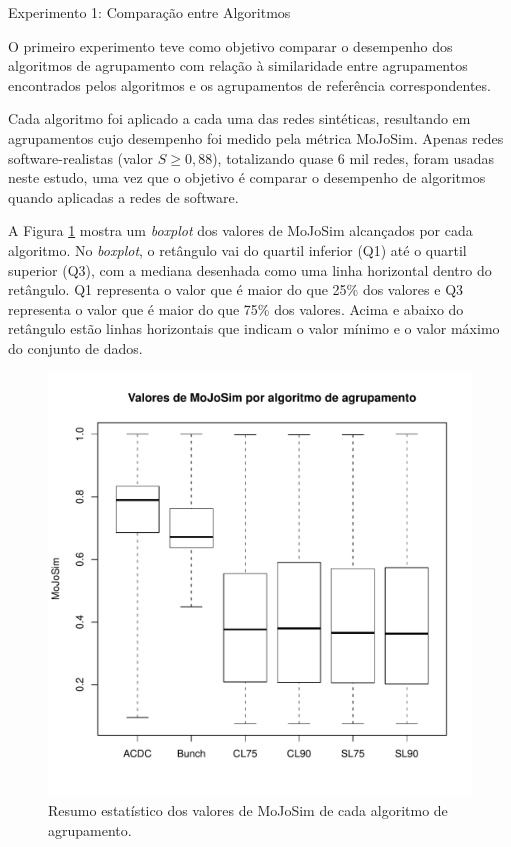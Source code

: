 \begin{section}{Experimento 1: Comparação entre Algoritmos}

O primeiro experimento teve como objetivo comparar o desempenho dos algoritmos de agrupamento com relação à similaridade entre agrupamentos encontrados pelos algoritmos e os agrupamentos de referência correspondentes.

Cada algoritmo foi aplicado a cada uma das redes sintéticas, resultando em agrupamentos cujo desempenho foi medido pela métrica MoJoSim. Apenas redes software-realistas (valor $S \ge 0,88$), totalizando quase 6 mil redes, foram usadas neste estudo, uma vez que o objetivo é comparar o desempenho de algoritmos quando aplicadas a redes de software.

A Figura \ref{fig:box-mojo-por-alg} mostra um \emph{boxplot} dos valores de MoJoSim alcançados por cada algoritmo. No \emph{boxplot}, o retângulo vai do quartil inferior (Q1) até o quartil superior (Q3), com a mediana desenhada como uma linha horizontal dentro do retângulo. Q1 representa o valor que é maior do que 25\% dos valores e Q3 representa o valor que é maior do que 75\% dos valores. Acima e abaixo do retângulo estão linhas horizontais que indicam o valor mínimo e o valor máximo do conjunto de dados. %

\begin{figure}[htbp]
	\centering
		\includegraphics[scale=0.5]{figuras/box-mojo-por-alg}
	\caption{Resumo estatístico dos valores de MoJoSim de cada algoritmo de agrupamento.}
	\label{fig:box-mojo-por-alg}
\end{figure}


\end{section}
